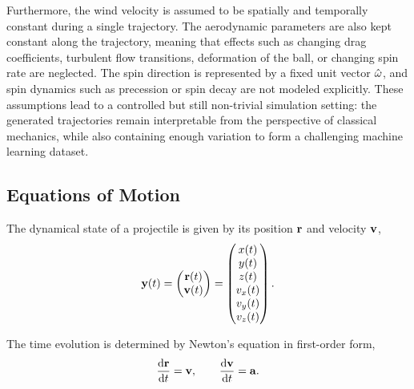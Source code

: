 Furthermore, the wind velocity is assumed to be spatially and temporally constant during a single trajectory.
The aerodynamic parameters are also kept constant along the trajectory, meaning that effects such as changing drag coefficients, turbulent flow transitions, deformation of the ball, or changing spin rate are neglected.
The spin direction is represented by a fixed unit vector $\hat{\vb{\omega}}$, and spin dynamics such as precession or spin decay are not modeled explicitly.
These assumptions lead to a controlled but still non-trivial simulation setting: the generated trajectories remain interpretable from the perspective of classical mechanics, while also containing enough variation to form a challenging machine learning dataset.

\subsection{Equations of Motion}

The dynamical state of a projectile is given by its position $\vb{r}$ and velocity $\vb{v}$,
\begin{equation*}
    \vb{y}(t) = \begin{pmatrix}
        \vb{r}(t) \\ \vb{v}(t)
    \end{pmatrix} = \begin{pmatrix}
        x(t) \\ y(t) \\ z(t) \\ v_x(t) \\ v_y(t) \\ v_z(t)
    \end{pmatrix}.
\end{equation*}

The time evolution is determined by Newton's equation in first-order form,
\begin{equation*}
    \dv{\vb{r}}{t} = \vb{v}, \qquad \dv{\vb{v}}{t} = \vb{a}.
\end{equation*}

